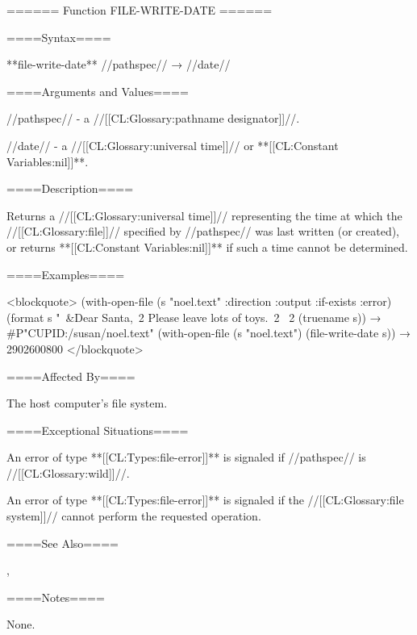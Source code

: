 ====== Function FILE-WRITE-DATE ======

====Syntax====

**file-write-date** //pathspec// → //date//

====Arguments and Values====

//pathspec// - a //[[CL:Glossary:pathname designator]]//.

//date// - a //[[CL:Glossary:universal time]]// or **[[CL:Constant Variables:nil]]**.

====Description====

Returns a //[[CL:Glossary:universal time]]// representing the time at which the //[[CL:Glossary:file]]// specified by //pathspec// was last written (or created), or returns **[[CL:Constant Variables:nil]]** if such a time cannot be determined.

====Examples====

<blockquote> (with-open-file (s "noel.text" :direction :output :if-exists :error) (format s "~&Dear Santa,~2 Please leave lots of toys.~2 ~2 (truename s)) → #P"CUPID:/susan/noel.text" (with-open-file (s "noel.text") (file-write-date s)) → 2902600800 </blockquote>

====Affected By====

The host computer's file system.

====Exceptional Situations====

An error of type **[[CL:Types:file-error]]** is signaled if //pathspec// is //[[CL:Glossary:wild]]//.

An error of type **[[CL:Types:file-error]]** is signaled if the //[[CL:Glossary:file system]]// cannot perform the requested operation.

====See Also====

{\secref\UniversalTime},

{\secref\PathnamesAsFilenames}

====Notes====

None.


    
